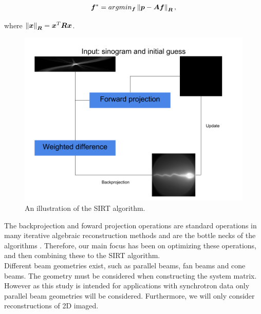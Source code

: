 \begin{align}
 \vec{f}^{\ast}=argmin_{\vec{f}}\norm{\vec{p}-\mat{A}\vec{f}}_{\mat{R}},
\end{align}

where $\norm{\vec{x}}_{\mat{R}} = \vec{x}^T\mat{R}\vec{x}$.

\begin{figure}
\includegraphics[width=\linewidth]{images/sirt.png}
\caption{An illustration of the SIRT algorithm.}
\label{fig:sirt}
\end{figure}

The backprojection and foward projection operations are standard operations in many iterative algebraic reconstruction methods and are the bottle necks of the algorithms . Therefore, our main focus has been on optimizing these operations, and then combining these to the SIRT algorithm.\\
Different beam geometries exist, such as parallel beams, fan beams and cone beams. The geometry must be considered when constructing the system matrix. However as this study is intended for applications with synchrotron data only parallel beam geometries will be considered. Furthermore, we will only consider reconstructions of 2D imaged.\\
